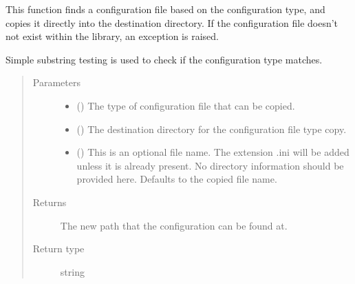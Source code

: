 \documentclass[letterpaper,10pt,english]{sphinxmanual}
\begin{document}
\begin{fulllineitems}
\label{\detokenize{docstrings/ifa_smeargle.core.configuration:ifa_smeargle.core.configuration.copy_configuration_file}}
This function finds a configuration file based on the
configuration type, and copies it directly into the destination
directory. If the configuration file doesn’t not exist within
the library, an exception is raised.

Simple substring testing is used to check if the configuration
type matches.
\begin{quote}\begin{description}
\item[{Parameters}] \leavevmode\begin{itemize}
\item {} 
 () \textendash{} The type of configuration file that can be copied.

\item {} 
 () \textendash{} The destination directory for the configuration file type
copy.

\item {} 
 (\sphinxstyleliteralemphasis{\sphinxupquote{ (}}\sphinxstyleliteralemphasis{\sphinxupquote{)}}) \textendash{} This is an optional file name. The extension .ini will be
added unless it is already present. No directory information
should be provided here. Defaults to the copied file name.

\end{itemize}

\item[{Returns}] \leavevmode
{} \textendash{} The new path that the configuration can be found at.

\item[{Return type}] \leavevmode
string

\end{description}\end{quote}

\end{fulllineitems}
\end{document}

